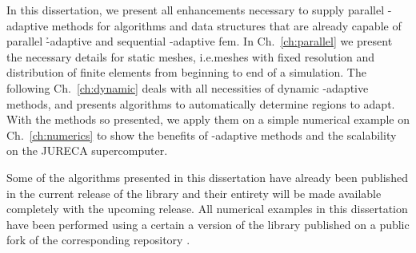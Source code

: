In this dissertation, we present all enhancements necessary to supply parallel \hp-adaptive methods for algorithms and data structures that are already capable of parallel \h-adaptive and sequential \hp-adaptive \gls{fem}. In Ch.~\ref{ch:parallel} we present the necessary details for static meshes, i.e.\@ meshes with fixed resolution and distribution of finite elements from beginning to end of a simulation. The following Ch.~\ref{ch:dynamic} deals with all necessities of dynamic \hp-adaptive methods, and presents algorithms to automatically determine regions to adapt. With the methods so presented, we apply them on a simple numerical example on Ch.~\ref{ch:numerics} to show the benefits of \hp-adaptive methods and the scalability on the JURECA supercomputer.

Some of the algorithms presented in this dissertation have already been published in the current release of the \dealii{} library \parencite{arndt2019,dealii920pre} and their entirety will be made available completely with the upcoming release. All numerical examples in this dissertation have been performed using a certain a version of the library published on a public fork \textcite{finaldissertation} of the corresponding \dealii{} repository \textcite{dealii920pre}.
